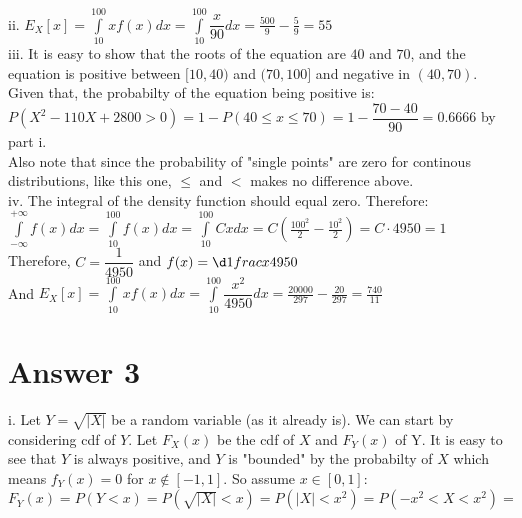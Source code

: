 \documentclass[12pt]{article}
\begin{document}
ii. $E_X[x] = \displaystyle\int\limits_{10}^{100} xf(x)dx =  \displaystyle\int\limits_{10}^{100}  \dfrac{x}{90}dx =\frac{500}{9}-\frac{5}{9} = 55   $ \\

iii. It is easy to show that the roots of the equation are $40$ and $70$, and the equation is positive between $[10,40)$ and $(70,100]$ and negative in $(40,70)$. Given that, the probabilty of the equation being positive is: \\

$P(X^2-110X+2800>0) = 1 - P(40 \leq x \leq 70) = 1 -  \dfrac{70-40}{90} = 0.6666 $ by part i. \\

Also note that since the probability of "single points" are zero for continous distributions, like this one, $\leq$ and $<$ makes no difference above. \\

iv. The integral of the density function should equal zero. Therefore: \\

$  \displaystyle\int\limits_{-\infty}^{+\infty} f(x)dx  = \displaystyle\int\limits_{10}^{100} f(x)dx = \displaystyle\int\limits_{10}^{100}Cxdx =C ( \frac{100^2}{2}-\frac{10^2}{2}) = C\cdot 4950 = 1$ \\ 

Therefore, $C=\dfrac{1}{4950} $ and $f(x) = \d1frac{x}{4950} $ \\

And $E_X[x] = \displaystyle\int\limits_{10}^{100} xf(x)dx =  \displaystyle\int\limits_{10}^{100}  \dfrac{x^2}{4950}dx =\frac{20000}{297}-\frac{20}{297} = \frac{740}{11} $ \\



\section*{Answer 3} 

\quad i. Let $Y=\sqrt{|X|} $ be a random variable (as it already is). We can start by considering cdf of $Y$. Let $F_X(x)$ be the cdf of $X$ and $F_Y(x)$ of Y. It is easy to see that $Y$ is always positive, and $Y$ is "bounded" by the probabilty of $X$ which means $f_Y(x)=0$ for $x\notin [-1,1]$. So assume $x\in [0,1]$: \\

$F_Y(x) = P(Y<x) = P( \sqrt{|X|} < x) = P( |X| < x^2 ) = P( -x^2 < X < x^2 ) = $ \\ 
\end{document}
